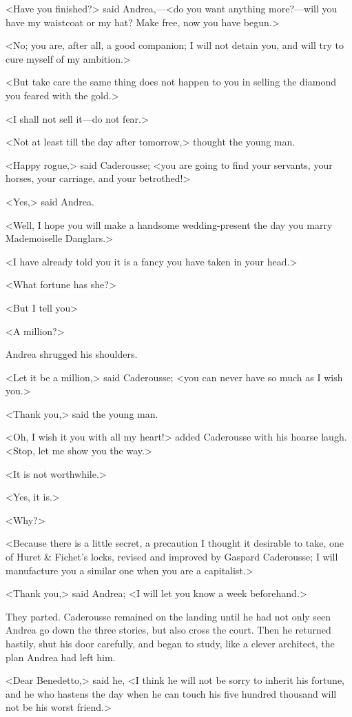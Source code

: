  <Have you finished?> said Andrea,—<do you want anything more?—will you have my waistcoat or my hat? Make free, now you have begun.> 

 <No; you are, after all, a good companion; I will not detain you, and will try to cure myself of my ambition.> 

 <But take care the same thing does not happen to you in selling the diamond you feared with the gold.> 

 <I shall not sell it—do not fear.> 

 <Not at least till the day after tomorrow,> thought the young man. 

 <Happy rogue,> said Caderousse; <you are going to find your servants, your horses, your carriage, and your betrothed!> 

 <Yes,> said Andrea. 

 <Well, I hope you will make a handsome wedding-present the day you marry Mademoiselle Danglars.> 

 <I have already told you it is a fancy you have taken in your head.> 

 <What fortune has she?> 

 <But I tell you\longdash> 

 <A million?> 

 Andrea shrugged his shoulders. 

 <Let it be a million,> said Caderousse; <you can never have so much as I wish you.> 

 <Thank you,> said the young man. 

 <Oh, I wish it you with all my heart!> added Caderousse with his hoarse laugh. <Stop, let me show you the way.> 

 <It is not worthwhile.> 

 <Yes, it is.> 

 <Why?> 

 <Because there is a little secret, a precaution I thought it desirable to take, one of Huret \& Fichet's locks, revised and improved by Gaspard Caderousse; I will manufacture you a similar one when you are a capitalist.> 

 <Thank you,> said Andrea; <I will let you know a week beforehand.> 

 They parted. Caderousse remained on the landing until he had not only seen Andrea go down the three stories, but also cross the court. Then he returned hastily, shut his door carefully, and began to study, like a clever architect, the plan Andrea had left him. 

 <Dear Benedetto,> said he, <I think he will not be sorry to inherit his fortune, and he who hastens the day when he can touch his five hundred thousand will not be his worst friend.> 
